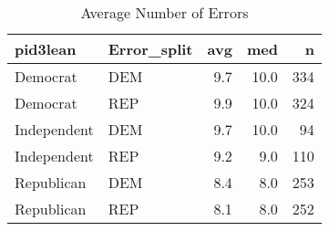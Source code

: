 \begin{table}[!htb]
\centering
\begin{tabular}{llrrr}
  \hline
pid3lean & Error\_split & avg & med & n \\ 
  \hline
Democrat     & DEM & 9.7 & 10.0 & 334 \\ 
  Democrat     & REP & 9.9 & 10.0 & 324 \\ 
  Independent  & DEM & 9.7 & 10.0 & 94 \\ 
  Independent  & REP & 9.2 & 9.0 & 110 \\ 
  Republican   & DEM & 8.4 & 8.0 & 253 \\ 
  Republican   & REP & 8.1 & 8.0 & 252 \\ 
   \hline
\end{tabular}
\caption{Average Number of Errors} 
\label{tab:error_sum}
\end{table}
